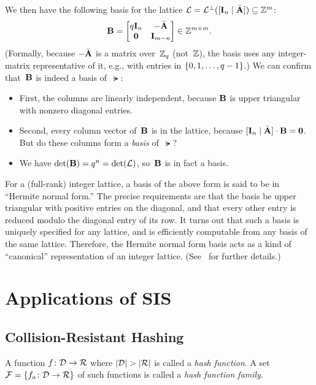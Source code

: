 \documentclass[11pt]{article}
\newcommand{\calR}{\ensuremath{\mathcal{R}}}
\begin{document}
We then have the following basis for the lattice
$\mathcal{L} = \mathcal{L}^{\perp}([\mathbf{I}_{n} \mid \bar{\mathbf{A}}]) \subseteq \mathbb{Z}^{m}$:
\[ \mathbf{B} =
  \begin{bmatrix}
    q\mathbf{I}_n & -\bar{\mathbf{A}} \\
    \mathbf{0} & \mathbf{I}_{m-n}
  \end{bmatrix} \in \mathbb{Z}^{m \times m}.
\]
(Formally, because $-\bar{\mathbf{A}}$ is a matrix over~$\mathbb{Z}_q$ (not~$\mathbb{Z}$),
the basis uses any integer-matrix representative of it, e.g., with
entries in $\{0,1,\ldots,q-1\}$.) We can confirm that~$\mathbf{B}$ is
indeed a basis of~$\lat$:
\begin{itemize}
\item First, the columns are linearly independent, because $\mathbf{B}$ is
  upper triangular with nonzero diagonal entries.
\item Second, every column vector of~$\mathbf{B}$ is in the lattice,
  because $[\mathbf{I}_{n} \mid \bar{\mathbf{A}}] \cdot \mathbf{B} = \mathbf{0}$. But
  do these columns form a \emph{basis} of~$\lat$?
\item We have $\det(\mathbf{B}) = q^{n} = \det(\mathcal{L})$, so~$\mathbf{B}$ is in
  fact a basis.
\end{itemize}

For a (full-rank) integer lattice, a basis of the above form is said
to be in ``Hermite normal form.'' The precise requirements are that
the basis be upper triangular with positive entries on the diagonal,
and that every other entry is reduced modulo the diagonal entry of its
row. It turns out that such a basis is uniquely specified for any
lattice, and is efficiently computable from any basis of the same
lattice. Therefore, the Hermite normal form basis acts as a kind of
``canonical'' representation of an integer lattice.
(See~\cite{DBLP:conf/issac/MicciancioW01,DBLP:conf/calc/Micciancio01}
for further details.)

\section{Applications of SIS}
\label{sec:applications}

\subsection{Collision-Resistant Hashing}
\label{sec:coll-resist-hash}

\begin{definition}
  A function $f \colon \calD \to \calR$ where
  $\abs{\calD} > \abs{\calR}$ is called a \emph{hash function}. A set
  $\calF = \set{f_{a} \colon \calD \to \calR}$ of such functions is
  called a \emph{hash function family}.
\end{definition}
\end{document}
